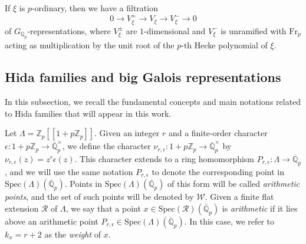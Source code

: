 \documentclass[a4paper,11pt]{amsart}
\theoremstyle{plain}
\theoremstyle{definition}
\theoremstyle{remark}
\newcommand{\bb}{\mathbb}
\newcommand{\cl}{\mathcal}
\newcommand{\Fr}{\mathrm{Fr}}
\numberwithin{equation}{section}
\begin{document}
If $\xi$ is $p$-ordinary, then we have a filtration
\[
0\rightarrow V_\xi^+\rightarrow V_\xi \rightarrow V_\xi^-\rightarrow 0
\]
of $G_{\bb{Q}_p}$-representations, where $V_\xi^{\pm}$ are $1$-dimensional and $V_\xi^-$ is unramified with $\Fr_p$ acting as multiplication by the unit root of the $p$-th Hecke polynomial of $\xi$.


\subsection{Hida families and big Galois representations}\label{subsec:families}

In this subsection, we recall the fundamental concepts and main notations related to Hida families that will appear in this work.

Let $\Lambda=\bb{Z}_p[[1+p\bb{Z}_p]]$. Given an integer $r$ and a finite-order character $\epsilon:1+p\bb{Z}_p\rightarrow \overline{\bb{Q}}_p^\times$, we define the character $\nu_{r,\epsilon}:1+p\bb{Z}_p\rightarrow \overline{\bb{Q}}_p^\times$ by $\nu_{r,\epsilon}(z)=z^r\epsilon(z)$. This character extends to a ring homomorphism $P_{r,\epsilon}:\Lambda \rightarrow \overline{\bb{Q}}_p$, and we will use the same notation $P_{r,\epsilon}$ to denote the corresponding point in $\mathrm{Spec}(\Lambda)(\overline{\bb{Q}}_p)$. Points in $\mathrm{Spec}(\Lambda)(\overline{\bb{Q}}_p)$ of this form will be called \textit{arithmetic points}, and the set of such points will be denoted by $\cl{W}$. Given a finite flat extension $\cl{R}$ of $\Lambda$, we say that a point $x\in \mathrm{Spec}(\cl{R})(\overline{\bb{Q}}_p)$ is \emph{arithmetic} if it lies above an arithmetic point $P_{r,\epsilon}\in \mathrm{Spec}(\Lambda)(\overline{\bb{Q}}_p)$. In this case, we refer to $k_x=r+2$ as the \emph{weight} of $x$.
\end{document}
